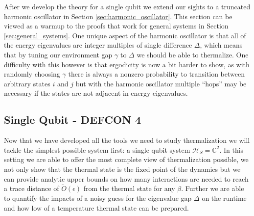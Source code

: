 \documentclass{article}
\newcommand{\hilb}{\mathcal{H}}
\newcommand{\identity}{\mathds{1}}
\begin{document}
After we develop the theory for a single qubit we extend our sights to a truncated harmonic oscillator in Section \ref{sec:harmonic_oscillator}. This section can be viewed as a warmup to the proofs that work for general systems in Section \ref{sec:general_systems}. One unique aspect of the harmonic oscillator is that all of the energy eigenvalues are integer multiples of single difference $\Delta$, which means that by tuning our environment gap $\gamma$ to $\Delta$ we should be able to thermalize. One difficulty with this however is that ergodicity is now a bit harder to show, as with randomly choosing $\gamma$ there is always a nonzero probability to transition between arbitrary states $i$ and $j$ but with the harmonic oscillator multiple ``hops'' may be necessary if the states are not adjacent in energy eigenvalues.

\subsection{Single Qubit - DEFCON 4} \label{sec:single_qubit}
Now that we have developed all the tools we need to study thermalization we will tackle the simplest possible system first: a single qubit system $\hilb_S = \mathbb{C}^2$. In this setting we are able to offer the most complete view of thermalization possible, we not only show that the thermal state is the fixed point of the dynamics but we can provide analytic upper bounds on how many interactions are needed to reach a trace distance of $\widetilde{O}(\epsilon)$ from the thermal state for any $\beta$. Further we are able to quantify the impacts of a noisy guess for the eigenvalue gap $\Delta$ on the runtime and how low of a temperature thermal state can be prepared. 


\end{document}
